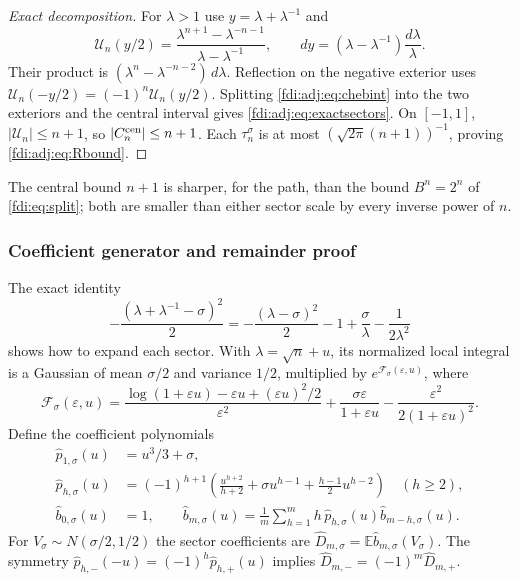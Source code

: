 \documentclass[11pt,letterpaper]{article}
\theoremstyle{remark}\newtheorem{remark}[theorem]{Remark}
\newcommand{\E}{\mathbb E}\newcommand{\Prb}{\mathbb P}\newcommand{\R}{\mathbb R}\newcommand{\C}{\mathbb C}
\newcommand{\eps}{\varepsilon}\newcommand{\Pois}{\operatorname{Poisson}}
\begin{document}
\begin{proof}[Exact decomposition]
For $\lambda>1$ use $y=\lambda+\lambda^{-1}$ and
\[
 \mathcal U_n(y/2)=\frac{\lambda^{n+1}-\lambda^{-n-1}}{\lambda-\lambda^{-1}},
 \qquad dy=(\lambda-\lambda^{-1})\frac{d\lambda}{\lambda}.
\]
Their product is $(\lambda^n-\lambda^{-n-2})\,d\lambda$. Reflection on the negative exterior uses $\mathcal U_n(-y/2)=(-1)^n\mathcal U_n(y/2)$. Splitting \eqref{fdi:adj:eq:chebint} into the two exteriors and the central interval gives \eqref{fdi:adj:eq:exactsectors}. On $[-1,1]$, $|\mathcal U_n|\le n+1$, so $|C_n^{\rm cen}|\le n+1$. Each $\tau_n^\sigma$ is at most $(\sqrt{2\pi}(n+1))^{-1}$, proving \eqref{fdi:adj:eq:Rbound}.
\end{proof}
The central bound $n+1$ is sharper, for the path, than the bound $B^n=2^n$ of \eqref{fdi:eq:split}; both are smaller than either sector scale by every inverse power of $n$.

\subsubsection*{Coefficient generator and remainder proof}
The exact identity
\[
 -\frac{(\lambda+\lambda^{-1}-\sigma)^2}{2}
 =-\frac{(\lambda-\sigma)^2}{2}-1+\frac{\sigma}{\lambda}
                                          -\frac1{2\lambda^2}
\]
shows how to expand each sector. With $\lambda=\sqrt n+u$, its normalized local integral is a Gaussian of mean $\sigma/2$ and variance $1/2$, multiplied by $e^{\mathcal F_\sigma(\eps,u)}$, where
\begin{equation}\label{fdi:adj:eq:Fsector}
 \mathcal F_\sigma(\eps,u)=\frac{\log(1+\eps u)-\eps u+(\eps u)^2/2}{\eps^2}
       +\frac{\sigma \eps}{1+\eps u}-\frac{\eps^2}{2(1+\eps u)^2}.
\end{equation}
Define the coefficient polynomials
\begin{align*}
 \widehat p_{1,\sigma}(u)&=u^3/3+\sigma,\\
 \widehat p_{h,\sigma}(u)&=(-1)^{h+1}
 \left(\frac{u^{h+2}}{h+2}+\sigma u^{h-1}+\frac{h-1}{2}u^{h-2}\right)
 \quad(h\ge2),\\
 \widehat b_{0,\sigma}(u)&=1,\qquad
 \widehat b_{m,\sigma}(u)=\frac1m\sum_{h=1}^mh\,\widehat p_{h,\sigma}(u)\widehat b_{m-h,\sigma}(u).
\end{align*}
For $V_\sigma\sim N(\sigma/2,1/2)$ the sector coefficients are
$\widehat D_{m,\sigma}=\E \widehat b_{m,\sigma}(V_\sigma)$. The symmetry
$\widehat p_{h,-}(-u)=(-1)^h\widehat p_{h,+}(u)$ implies $\widehat D_{m,-}=(-1)^m\widehat D_{m,+}$.
\end{document}
